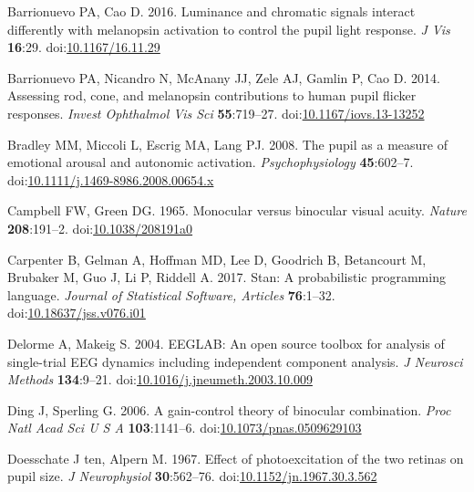 \documentclass[
]{article}
\newlength{\cslhangindent}
\newlength{\cslentryspacingunit} %
\newenvironment{CSLReferences}[2] %
 {%
  \setlength{\parindent}{0pt}
  \ifodd #1
  \let\oldpar\par
  \def\par{\hangindent=\cslhangindent\oldpar}
  \fi
  \setlength{\parskip}{#2\cslentryspacingunit}
 }%
 {}
\begin{document}
\begin{CSLReferences}{1}{0}
\leavevmode{}%
Barrionuevo PA, Cao D. 2016. Luminance and chromatic signals interact differently with melanopsin activation to control the pupil light response. \emph{J Vis} \textbf{16}:29. doi:\href{https://doi.org/10.1167/16.11.29}{10.1167/16.11.29}

\leavevmode{}%
Barrionuevo PA, Nicandro N, McAnany JJ, Zele AJ, Gamlin P, Cao D. 2014. Assessing rod, cone, and melanopsin contributions to human pupil flicker responses. \emph{Invest Ophthalmol Vis Sci} \textbf{55}:719--27. doi:\href{https://doi.org/10.1167/iovs.13-13252}{10.1167/iovs.13-13252}

\leavevmode{}%
Bradley MM, Miccoli L, Escrig MA, Lang PJ. 2008. The pupil as a measure of emotional arousal and autonomic activation. \emph{Psychophysiology} \textbf{45}:602--7. doi:\href{https://doi.org/10.1111/j.1469-8986.2008.00654.x}{10.1111/j.1469-8986.2008.00654.x}

\leavevmode{}%
Campbell FW, Green DG. 1965. Monocular versus binocular visual acuity. \emph{Nature} \textbf{208}:191--2. doi:\href{https://doi.org/10.1038/208191a0}{10.1038/208191a0}

\leavevmode{}%
Carpenter B, Gelman A, Hoffman MD, Lee D, Goodrich B, Betancourt M, Brubaker M, Guo J, Li P, Riddell A. 2017. Stan: A probabilistic programming language. \emph{Journal of Statistical Software, Articles} \textbf{76}:1--32. doi:\href{https://doi.org/10.18637/jss.v076.i01}{10.18637/jss.v076.i01}

\leavevmode{}%
Delorme A, Makeig S. 2004. {EEGLAB}: An open source toolbox for analysis of single-trial {EEG} dynamics including independent component analysis. \emph{J Neurosci Methods} \textbf{134}:9--21. doi:\href{https://doi.org/10.1016/j.jneumeth.2003.10.009}{10.1016/j.jneumeth.2003.10.009}

\leavevmode{}%
Ding J, Sperling G. 2006. A gain-control theory of binocular combination. \emph{Proc Natl Acad Sci U S A} \textbf{103}:1141--6. doi:\href{https://doi.org/10.1073/pnas.0509629103}{10.1073/pnas.0509629103}

\leavevmode{}%
Doesschate J ten, Alpern M. 1967. Effect of photoexcitation of the two retinas on pupil size. \emph{J Neurophysiol} \textbf{30}:562--76. doi:\href{https://doi.org/10.1152/jn.1967.30.3.562}{10.1152/jn.1967.30.3.562}


\end{CSLReferences}
\end{document}
